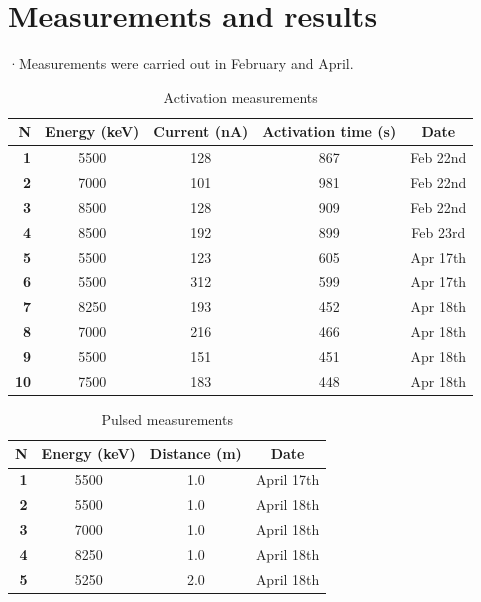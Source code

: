 \documentclass[a4paper,12pt]{report}
\begin{document}
\chapter{Measurements and results}
·Measurements were carried out in February and April.\\

\begin{table}[h]	%
\centering
\begin{tabular}[c]{>{\bfseries}r||c|c|c|c}
	N & Energy (\unit{\keV}) & Current (\unit{\nano\A}) & Activation time (\unit{\s}) & Date\tablefootnote{All took place in 2023.\label{date_tablefootnote}} \\ \hline
	1	&\num{5500}&\num{128}&\num{867}&Feb 22nd\\ \hline
	2	&\num{7000}&\num{101}&\num{981}&Feb 22nd\\ \hline
	3	&\num{8500}&\num{128}&\num{909}&Feb 22nd\\ \hline
	4	&\num{8500}&\num{192}&\num{899}&Feb 23rd\\ \hline
	5	&\num{5500}&\num{123}&\num{605}&Apr 17th\\ \hline
	6	&\num{5500}&\num{312}&\num{599}&Apr 17th\\ \hline
	7	&\num{8250}&\num{193}&\num{452}&Apr 18th\\ \hline
	8	&\num{7000}&\num{216}&\num{466}&Apr 18th\\ \hline
	9	&\num{5500}&\num{151}&\num{451}&Apr 18th\\ \hline
	10	&\num{7500}&\num{183}&\num{448}&Apr 18th\\ \hline
\end{tabular}
\label{activation_measurements_table}
\caption{Activation measurements}
\end{table}

\begin{table}[h]	%
\centering
\begin{tabular}[c]{>{\bfseries}r||c|c|c}
	N& Energy (\unit{\keV}) & Distance (\unit{\meter}) & Date\footref{date_tablefootnote} \\ \hline	%
	1&\num{5500}&\num{1.0}&April 17th\\ \hline
	2&\num{5500}&\num{1.0}&April 18th\\ \hline
	3&\num{7000}&\num{1.0}&April 18th\\ \hline
	4&\num{8250}&\num{1.0}&April 18th\\ \hline
	5&\num{5250}&\num{2.0}&April 18th\\ \hline
\end{tabular}
\label{pulsed_measurements_table}
\caption{Pulsed measurements}
\end{table}
\end{document}
